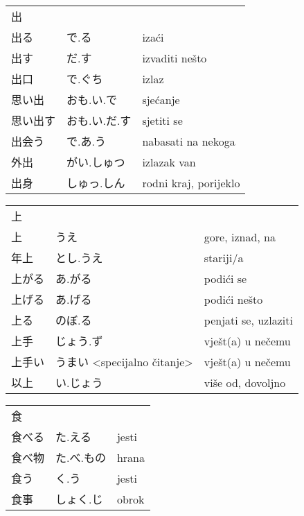

\newenvironment{dictentry}[1]{
	\begin{tabular}{p{2cm} p{3cm} p{10cm}}
		#1 &&\\
}{
	\end{tabular}
	\vspace{20pt}
}

\newcommand{\example}[3]{
	\hspace*{\fill}#1 & #2 & #3\\
}

\author{ロボット君}


\begin{dictentry}{出}
\example{出る}{で.る}{izaći}
\example{出す}{だ.す}{izvaditi nešto}
\example{出口}{で.ぐち}{izlaz}
\example{思い出}{おも.い.で}{sjećanje}
\example{思い出す}{おも.い.だ.す}{sjetiti se}
\example{出会う}{で.あ.う}{nabasati na nekoga}
\example{外出}{がい.しゅつ}{izlazak van}
\example{出身}{しゅっ.しん}{rodni kraj, porijeklo}
\end{dictentry}

\begin{dictentry}{上}
\example{上}{うえ}{gore, iznad, na}
\example{年上}{とし.うえ}{stariji/a}
\example{上がる}{あ.がる}{podići se}
\example{上げる}{あ.げる}{podići nešto}
\example{上る}{のぼ.る}{penjati se, uzlaziti}
\example{上手}{じょう.ず}{vješt(a) u nečemu}
\example{上手い}{うまい <specijalno čitanje>}{vješt(a) u nečemu}
\example{以上}{い.じょう}{više od, dovoljno}
\end{dictentry}

\begin{dictentry}{食}
\example{食べる}{た.える}{jesti}
\example{食べ物}{た.べ.もの}{hrana}
\example{食う}{く.う}{jesti}
\example{食事}{しょく.じ}{obrok}
\end{dictentry}

